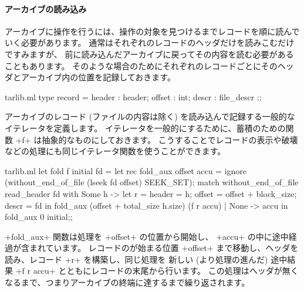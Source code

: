 \paragraph{アーカイブの読み込み}
アーカイブに操作を行うには、操作の対象を見つけるまでレコードを順に読んでいく必要があります。
通常はそれぞれのレコードのヘッダだけを読みこむだけですみますが、
前に読み込んだアーカイブに戻ってその内容を読む必要があることもあります。
そのような場合のためにそれぞれのレコードごとにそのヘッダとアーカイブ内の位置を記録しておきます。
%
\begin{listingcodefile}{tarlib.ml}
type record = { header : header; offset : int; descr : file_descr };;
\end{listingcodefile}
%
アーカイブのレコード (ファイルの内容は除く) を読み込んで記録する一般的なイテレータを定義します。
イテレータを一般的にするために、蓄積のための関数 \ml+f+ は抽象的なものにしておきます。
こうすることでレコードの表示や破壊などの処理にも同じイテレータ関数を使うことができます。
%
\begin{listingcodefile}{tarlib.ml}
let fold f initial fd  =
  let rec fold_aux offset accu =
    ignore (without_end_of_file (lseek fd offset) SEEK_SET);
    match without_end_of_file read_header fd with
      Some h ->
        let r =
          { header = h; offset = offset + block_size; descr = fd } in
        fold_aux (offset + total_size h.size) (f r accu)
    | None -> accu in
  fold_aux 0 initial;;
\end{listingcodefile}
%
\ml+fold_aux+ 関数は処理を \ml+offset+ の位置から開始し、 \ml+accu+ の中に途中経過が含まれています。
レコードのが始まる位置 \ml+offset+ まで移動し、ヘッダを読み、レコード \ml+r+ を構築し、同じ処理を
新しい (より処理の進んだ) 途中結果 \ml+f r accu+ とともにレコードの末尾から行います。
この処理はヘッダが無くなるまで、つまりアーカイブの終端に達するまで繰り返されます。

